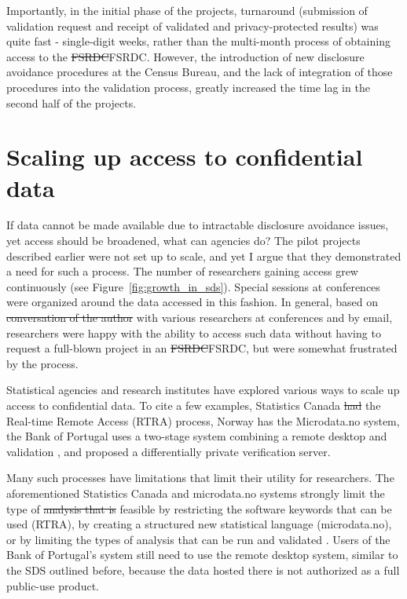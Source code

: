 \documentclass[inline]{hdsr} %
\providecommand{\DIFadd}[1]{{\protect\color{blue}\uwave{#1}}} %
\providecommand{\DIFdel}[1]{{\protect\color{red}\sout{#1}}}                      %
\providecommand{\DIFaddbegin}{} %
\providecommand{\DIFaddend}{} %
\providecommand{\DIFdelbegin}{} %
\providecommand{\DIFdelend}{} %
\begin{document}
Importantly, in the initial phase of the projects, turnaround (submission of validation request and receipt of validated and privacy-protected results) was quite fast - single-digit weeks, rather than the multi-month process of obtaining access to the \DIFdelbegin \DIFdel{FSRDC}\DIFdelend \DIFaddbegin \ac{FSRDC}\DIFaddend . However, the introduction of new disclosure avoidance procedures at the Census Bureau, and the lack of integration of those procedures into the validation process, greatly increased the time lag in the second half of the projects.

\section{Scaling up access to confidential data}

If data cannot be made available due to intractable disclosure avoidance issues, yet access should be broadened, what can agencies do? 
The pilot projects described earlier were not set up to scale, and yet I argue that  they demonstrated  a need for such a process. The number of researchers gaining access grew continuously (see Figure~\ref{fig:growth_in_sds}). Special sessions at conferences were organized around the data accessed in this fashion. In general, based on \DIFdelbegin \DIFdel{conversation of the author }\DIFdelend \DIFaddbegin \DIFadd{my conversations }\DIFaddend with various researchers at conferences and by email, researchers were happy with the ability to access such data without having to request a full-blown project in an \DIFdelbegin \DIFdel{FSRDC}\DIFdelend \DIFaddbegin \ac{FSRDC}\DIFaddend , but were somewhat frustrated by the process. 


Statistical agencies and research institutes have explored various ways to scale up access to confidential data. To cite a few examples, Statistics Canada \DIFdelbegin \DIFdel{had }\DIFdelend \DIFaddbegin \DIFadd{has }\DIFaddend the Real-time Remote Access (RTRA) process, Norway has the Microdata.no system, the Bank of Portugal uses a two-stage system combining a remote desktop and validation \citep{guimaraes_reproducibility_2023}, and \citet{barrientos_providing_2018} proposed a differentially private verification server. 

Many such processes have limitations that limit their utility for researchers. The aforementioned Statistics Canada and microdata.no systems strongly limit the type of \DIFdelbegin \DIFdel{analysis that is }\DIFdelend \DIFaddbegin \DIFadd{analyses that are }\DIFaddend feasible by restricting the software keywords that can be used (RTRA), by creating a structured new statistical language (microdata.no), or by limiting the types of analysis that can be run and validated \citep{barrientos_providing_2018}. Users of the Bank of Portugal's system still need to use the remote desktop system, similar to the SDS outlined before, because the data hosted there is not authorized as a full public-use product.
\end{document}
